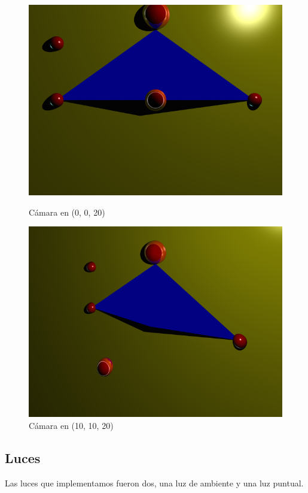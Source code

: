 \documentclass[a4paper,10pt]{article}
\begin{document}
\begin{figure}[ht]
\begin{minipage}[b]{0.5\linewidth}
\centering
\includegraphics[scale=0.25]{scene1_a.png}
\caption{C\'amara en (0, 0, 20)}
\label{fig:figure1}
\end{minipage}
\hspace{0.5cm}
\begin{minipage}[b]{0.5\linewidth}
\centering
\includegraphics[scale=0.25]{scene1.png}
\caption{C\'amara en (10, 10, 20)}
\label{fig:figure2}
\end{minipage}
\end{figure}

\subsection{Luces}
\label{luces}
Las luces que implementamos fueron dos, una luz de ambiente y una luz puntual.
\end{document}
